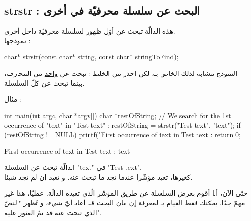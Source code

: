 \subsection{strstr : البحث عن سلسلة محرفيّة في أخرى}
هذه الدالّة تبحث عن أوّل ظهور لسلسلة محرفيّة داخل أخرى.\\
نموذجها :
\begin{Csource}
char* strstr(const char* string, const char* stringToFind);
\end{Csource}
النموذج مشابه لذلك الخاص بـ،
لكن احذر من الخلط :
تبحث عن
\underline{واحد}
من المحارف، بينما
تبحث عن كلّ السلسلة.

مثال :
\begin{Csource}
int main(int argc, char *argv[])
{
	char *restOfString;
	// We search for the 1st occurrence of "text" in "Test text" :
	restOfString = strstr("Test text", "text");
	if (restOfString != NULL)
	 {
    		printf("First occurrence of text in Test text : %
	}
	return 0;
}
\end{Csource}
\begin{Console}
First occurrence of text in Test text : text
\end{Console}
الدالّة
تبحث عن السلسلة
"\textenglish{text}"
في
"\textenglish{Test text}".\\
كغيرها، تعيد مؤشّرا عندما تجد ما تبحث عنه. و تعيد
إن لم تجد شيئا.

حتّى الآن، أنا أقوم بعرض السلسلة عن طريق المؤشّر الّذي تعيده الدالّة. عمليّا، هذا غير مهمّ جدّا. يمكنك فقط القيام بـ
لمعرفة إن مان البحث قد أعاد أيّ شيء، و تُظهر "النصّ الذي تبحث عنه قد تمّ العثور عليه".
